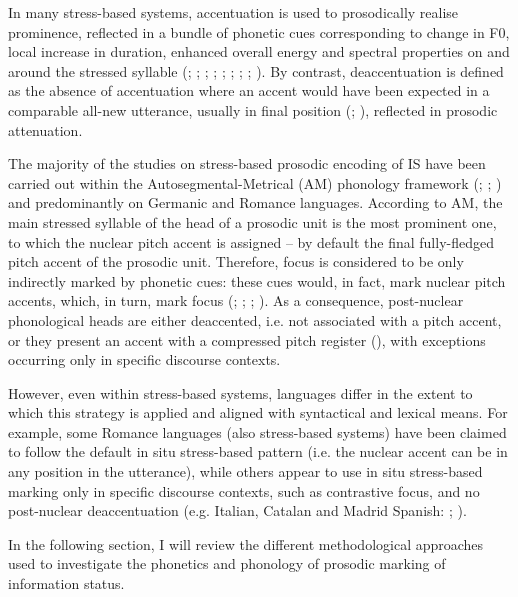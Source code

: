In many stress-based systems, accentuation is used to prosodically realise prominence, reflected in a bundle of phonetic cues corresponding to change in F0, local increase in duration, enhanced overall energy and spectral properties on and around the stressed syllable (\citealt{BaumannWinter2018}; \citealt{Campbell1995}; \citealt{DImperio2000}; \citealt{Heldner2003}; \citealt{HermesRump1994}; \citealt{KochanskiEtAl2005}; \citealt{KüglerCalhoun2020}; \citealt{SluijterVanHeuven1996}; \citealt{Turk2012}). By contrast, deaccentuation is defined as the absence of accentuation where an accent would have been expected in a comparable all-new utterance, usually in final position (\citealt{Cruttenden1997}; \citealt{Ladd1980}), reflected in prosodic attenuation.

The majority of the studies on stress-based prosodic encoding of IS have been carried out within the Autosegmental-Metrical (AM) phonology framework (\citealt{BeckmanEtAl2005}; \citealt{Ladd2008}; \citealt{Pierrehumbert1980}) and predominantly on Germanic and Romance languages. According to AM, the main stressed syllable of the head of a prosodic unit is the most prominent one, to which the nuclear pitch accent is assigned – by default the final fully-fledged pitch accent of the prosodic unit. Therefore, focus is considered to be only indirectly marked by phonetic cues: these cues would, in fact, mark nuclear pitch accents, which, in turn, mark focus (\citealt{Büring2016}; \citealt{Calhoun2010}; \citealt{Ladd2008}; \citealt{Selkirk1995}). As a consequence, post-nuclear phonological heads are either deaccented, i.e. not associated with a pitch accent, or they present an accent with a compressed pitch register (\citealt{KüglerFéry2017}), with exceptions occurring only in specific discourse contexts.

However, even within stress-based systems, languages differ in the extent to which this strategy is applied and aligned with syntactical and lexical means. For example, some Romance languages (also stress-based systems) have been claimed to follow the default in situ stress-based pattern (i.e. the nuclear accent can be in any position in the utterance), while others appear to use in situ stress-based marking only in specific discourse contexts, such as contrastive focus, and no post-nuclear deaccentuation (e.g. Italian, Catalan and Madrid Spanish: \citealt{FrotaPrieto2015}; \citealt{VanrellFernández-Soriano2018}).

In the following section, I will review the different methodological approaches used to investigate the phonetics and phonology of prosodic marking of information status. 

